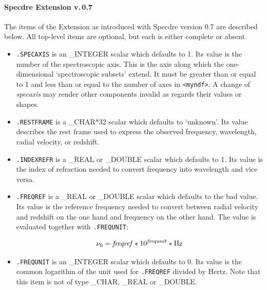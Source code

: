 
\paragraph{Specdre Extension v.\,0.7}

   The items of the Extension as introduced with Specdre version 0.7 are
   described below. All top-level items are optional, but each is either
   complete or absent.

\begin{itemize}

\item{\tt .SPECAXIS} is an \_INTEGER scalar which defaults to 1. Its
   value is the number of the spectroscopic axis. This is the axis along
   which the one-dimensional `spectroscopic subsets' extend. It must
   be greater than or equal to 1 and less than or equal to the number of
   axes in {\tt <myndf>}. A change of {\it specaxis} may render other
   components invalid as regards their values or shapes.

\item{\tt .RESTFRAME} is a \_CHAR*32 scalar which defaults to
   `unknown'.  Its value describes the rest frame used to express the
   observed frequency, wavelength, radial velocity, or redshift.

\item{\tt .INDEXREFR} is a \_REAL or \_DOUBLE scalar which defaults to
   1. Its value is the index of refraction needed to convert frequency
   into wavelength and vice versa.

\item{\tt .FREQREF} is a \_REAL or \_DOUBLE scalar which defaults to the
   bad value. Its value is the reference frequency needed to convert
   between radial velocity and redshift on the one hand and frequency on
   the other hand. The value is evaluated together with {\tt .FREQUNIT}:

   \[\nu_0={\it freqref}*10^{\it frequnit}*{\rm Hz}\]

\item{\tt .FREQUNIT} is an \_INTEGER scalar which defaults to 0. Its
   value is the common logarithm of the unit used for {\tt .FREQREF}
   divided by Hertz.  Note that this item is not of type \_CHAR, \_REAL
   or \_DOUBLE.


\end{itemize}
